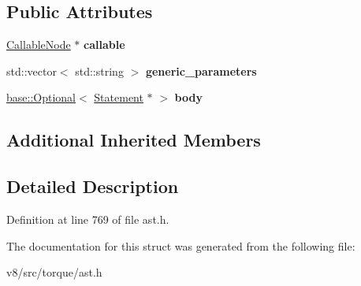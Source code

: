 \subsection*{Public Attributes}
\begin{DoxyCompactItemize}
\item 
\mbox{\label{structv8_1_1internal_1_1torque_1_1GenericDeclaration_addbc5da3a8187f5c5902ad0d44ed82f5}} 
\mbox{\hyperlink{structv8_1_1internal_1_1torque_1_1CallableNode}{Callable\+Node}} $\ast$ {\bfseries callable}
\item 
\mbox{\label{structv8_1_1internal_1_1torque_1_1GenericDeclaration_a3dcb44bf01ed05bcb0ecce73048482e6}} 
std\+::vector$<$ std\+::string $>$ {\bfseries generic\+\_\+parameters}
\item 
\mbox{\label{structv8_1_1internal_1_1torque_1_1GenericDeclaration_a8f9b00dfcce1c224f80a26478821fc65}} 
\mbox{\hyperlink{classv8_1_1base_1_1Optional}{base\+::\+Optional}}$<$ \mbox{\hyperlink{structv8_1_1internal_1_1torque_1_1Statement}{Statement}} $\ast$ $>$ {\bfseries body}
\end{DoxyCompactItemize}
\subsection*{Additional Inherited Members}


\subsection{Detailed Description}


Definition at line 769 of file ast.\+h.



The documentation for this struct was generated from the following file\+:\begin{DoxyCompactItemize}
\item 
v8/src/torque/ast.\+h\end{DoxyCompactItemize}
